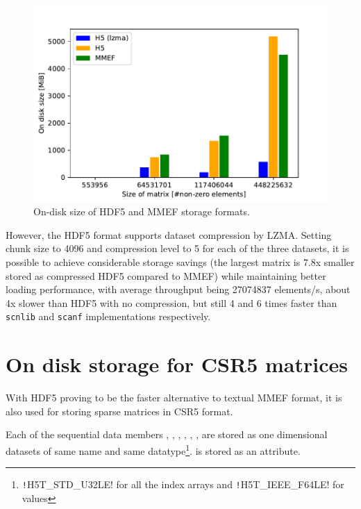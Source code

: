 \documentclass[thesis=M,english]{FITthesis}[2019/12/23]
\newcommand{\csre}[1]{\texttt!#1!}
\begin{document}
\begin{figure}[htp]
    \centering
    \includegraphics[scale=0.7]{static/mmef_vs_h5_stor.pdf}
    \caption{On-disk size of HDF5 and MMEF storage formats.}\label{impl:stor:size}
\end{figure}

However, the HDF5 format supports dataset compression by LZMA. Setting chunk size to 4096 and compression level to 5 for each of the three datasets,
it is possible to achieve considerable storage savings (the largest matrix is 7.8x smaller stored as compressed HDF5 compared to MMEF)
while maintaining better loading performance, with average throughput being \num{27074837} elements/s, about 4x slower than HDF5 with no compression,
but still 4 and 6 times faster than \texttt{scnlib} and \texttt{scanf} implementations respectively.


\section{On disk storage for CSR5 matrices}\label{csr5:onDisk}

With HDF5 proving to be the faster alternative to textual MMEF format, it is also used for storing sparse
matrices in CSR5 format.

Each of the sequential data members , , , ,
, , are stored as one dimensional datasets of same name
and same datatype\footnote{\csre{H5T_STD_U32LE} for all the index arrays and \csre{H5T_IEEE_F64LE} for values}.
 is stored as an attribute.
\end{document}
